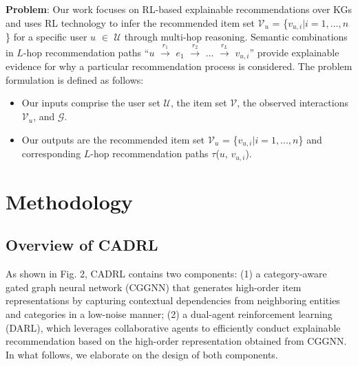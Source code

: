 \documentclass[conference]{IEEEtran}
\begin{document}
\textbf{Problem}: Our work focuses on RL-based explainable recommendations over KGs and uses RL technology to infer the recommended item set $\mathcal{V}_u$ = \{$v_{u,i}|i=1,...,n$\} for a specific user $u$ $\in$ $\mathcal{U}$ through multi-hop reasoning. Semantic combinations in $L$-hop recommendation paths ``$u$ $\stackrel{r_1}{\longrightarrow}$ $e_1$ $\stackrel{r_2}{\longrightarrow}$ ...  $\stackrel{r_{L}}{\longrightarrow}$ $v_{u,i}$''  provide explainable evidence for why a particular recommendation process is considered. The problem formulation is defined as follows:
	\begin{itemize}
		\item Our inputs comprise the user set $\mathcal{U}$, the item set $\mathcal{V}$, the observed interactions $\mathcal{V}_u$, and  $\mathcal{G}$.
		\item Our outputs are the recommended item set $\mathcal{V}_u$ = \{$v_{u,i}|i=1,...,n$\} and  corresponding $L$-hop recommendation paths $\tau$($u$, $v_{u,i}$).
	\end{itemize}



\section{Methodology}
\subsection{Overview of CADRL}
As shown in Fig. 2, CADRL contains two components: (1) a category-aware gated graph neural network (CGGNN) that generates high-order item representations by capturing contextual dependencies from neighboring entities and categories in a low-noise manner; (2) a dual-agent reinforcement learning (DARL), which leverages collaborative agents to efficiently conduct explainable  recommendation based on the high-order representation  obtained from CGGNN. In what follows, we elaborate on the design of both components.
\end{document}
